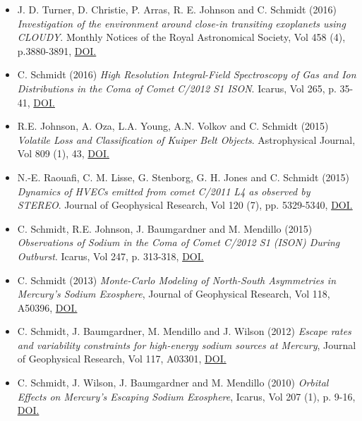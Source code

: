 \documentclass[12pt]{report}
\begin{document}
\begin{itemize}
  \item J. D. Turner, D. Christie, P. Arras, R. E. Johnson and C. Schmidt (2016) \textit{Investigation of the environment around close-in transiting exoplanets using CLOUDY}. Monthly Notices of the Royal Astronomical Society, Vol 458 (4), p.3880-3891, \href{https://doi.org/10.1093/mnras/stw556}{DOI.}
  \item C. Schmidt (2016) \textit{High Resolution Integral-Field Spectroscopy of Gas and Ion Distributions in the Coma of Comet C/2012 S1 ISON}. Icarus, Vol 265, p. 35-41, \href{https://doi.org/10.1016/j.icarus.2015.10.009}{DOI.}
  \item R.E. Johnson, A. Oza, L.A. Young, A.N. Volkov and C. Schmidt (2015) \textit{Volatile Loss and Classification of Kuiper Belt Objects}. Astrophysical Journal, Vol 809 (1), 43, \href{https://doi.org/10.1088/0004-637X/809/1/43}{DOI.}
  \item N.-E. Raouafi, C. M. Lisse, G. Stenborg, G. H. Jones and C. Schmidt (2015) \textit{Dynamics of HVECs emitted from comet C/2011 L4 as observed by STEREO}. Journal of Geophysical Research, Vol 120 (7), pp. 5329-5340, \href{https://doi.org/10.1002/2014JA020926}{DOI.}
  \item C. Schmidt, R.E. Johnson, J. Baumgardner and M. Mendillo (2015) \textit{Observations of Sodium in the Coma of Comet C/2012 S1 (ISON) During Outburst}. Icarus, Vol 247, p. 313-318, \href{https://doi.org/10.1016/j.icarus.2014.10.022}{DOI.}
  \item C. Schmidt (2013) \textit{Monte-Carlo Modeling of North-South Asymmetries in Mercury's Sodium Exosphere}, Journal of Geophysical Research, Vol 118, A50396, \href{https://doi.org/10.1002/jgra.50396}{DOI.}
  \item C. Schmidt, J. Baumgardner, M. Mendillo and J. Wilson (2012) \textit{Escape rates and variability constraints for high-energy sodium sources at Mercury}, Journal of Geophysical Research, Vol 117, A03301, \href{https://doi.org/10.1029/2011JA017217}{DOI.}
  \item C. Schmidt, J. Wilson, J. Baumgardner and M. Mendillo (2010) \textit{Orbital Effects on Mercury's Escaping Sodium Exosphere}, Icarus, Vol 207 (1), p. 9-16, \href{https://doi.org/10.1016/j.icarus.2009.10.017}{DOI.}
 \end{itemize}
\end{document}
